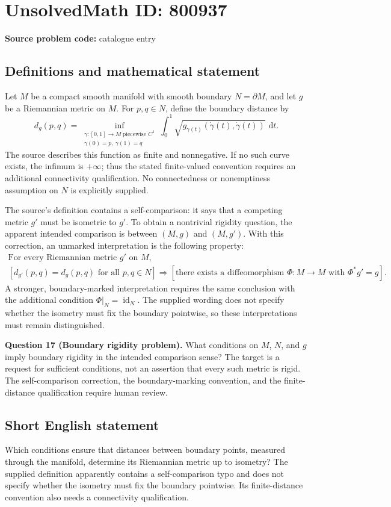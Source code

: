 \documentclass[11pt]{article}
\newcommand{\dd}{\,\mathrm{d}}
\begin{document}
\section*{UnsolvedMath ID: 800937}
\textbf{Source problem code:} catalogue entry
\subsection{Definitions and mathematical statement}
Let \(M\) be a compact smooth manifold with smooth boundary \(N=\partial M\), and let \(g\) be a Riemannian metric on \(M\). For \(p,q\in N\), define the boundary distance by
\[
d_g(p,q)=\inf_{\substack{\gamma:[0,1]\to M\ \text{piecewise }C^1\\ \gamma(0)=p,\ \gamma(1)=q}}\int_0^1\sqrt{g_{\gamma(t)}(\dot\gamma(t),\dot\gamma(t))}\,\dd t.
\]
The source describes this function as finite and nonnegative. If no such curve exists, the infimum is \(+\infty\); thus the stated finite-valued convention requires an additional connectivity qualification. No connectedness or nonemptiness assumption on \(N\) is explicitly supplied.

The source's definition contains a self-comparison: it says that a competing metric \(g'\) must be isometric to \(g'\). To obtain a nontrivial rigidity question, the apparent intended comparison is between \((M,g)\) and \((M,g')\). With this correction, an unmarked interpretation is the following property:
\[
\begin{gathered}
\text{For every Riemannian metric }g'\text{ on }M,\\
\left[d_{g'}(p,q)=d_g(p,q)\text{ for all }p,q\in N\right]
\Longrightarrow
\left[\text{there exists a diffeomorphism }\Phi:M\to M
\text{ with }\Phi^*g'=g\right].
\end{gathered}
\]
A stronger, boundary-marked interpretation requires the same conclusion with the additional condition \(\Phi|_N=\operatorname{id}_N\). The supplied wording does not specify whether the isometry must fix the boundary pointwise, so these interpretations must remain distinguished.

\textbf{Question 17 (Boundary rigidity problem).} What conditions on \(M\), \(N\), and \(g\) imply boundary rigidity in the intended comparison sense? The target is a request for sufficient conditions, not an assertion that every such metric is rigid. The self-comparison correction, the boundary-marking convention, and the finite-distance qualification require human review.
\subsection{Short English statement}
Which conditions ensure that distances between boundary points, measured through the manifold, determine its Riemannian metric up to isometry? The supplied definition apparently contains a self-comparison typo and does not specify whether the isometry must fix the boundary pointwise. Its finite-distance convention also needs a connectivity qualification.
\end{document}
